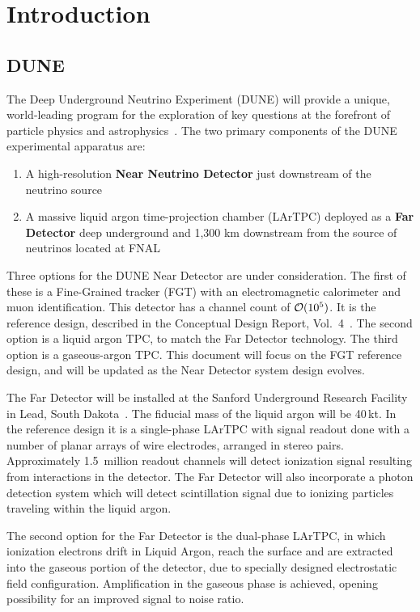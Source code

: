 \section{Introduction}
\subsection{DUNE}

The Deep Underground Neutrino Experiment (DUNE) will provide a unique, world-leading program
for the exploration of key questions at the forefront of particle physics and astrophysics~\cite{sciopps,cdr_vol2}.
The two primary components of the DUNE experimental apparatus are:

\begin{enumerate}

\item A high-resolution \textbf{Near Neutrino Detector} just downstream of the neutrino source
\item A massive liquid argon time-projection chamber (LArTPC) deployed as a \textbf{Far
Detector} deep underground and 1,300 km downstream from the source of neutrinos located at FNAL

\end{enumerate}

Three options for the DUNE Near Detector are under consideration.  The first of these is a Fine-Grained tracker (FGT) with
an electromagnetic calorimeter and muon identification.  This detector has a channel count of ${\cal O}(10^{5})$.  It is
the reference design, described in the Conceptual Design Report, Vol.~4~\cite{cdr_vol4_docdb}.  The second option is a liquid argon
TPC, to match the Far Detector technology.  The third option is a gaseous-argon TPC.  This document will focus on the FGT reference
design, and will be updated as the Near Detector system design evolves.

The Far Detector will be installed at the Sanford Underground Research Facility in Lead, South Dakota~\cite{surf}.
The fiducial mass of the liquid argon will be 40\,kt. In the reference design it is a single-phase LArTPC
with signal readout done with a number of planar arrays of wire electrodes, arranged in stereo pairs.
Approximately 1.5~million readout channels will detect ionization signal resulting from interactions in the detector. 
The Far Detector will also incorporate a photon detection system which will detect scintillation
signal due to ionizing particles traveling within the liquid argon.

The second option for the Far Detector is the dual-phase LArTPC, in which ionization electrons 
drift  in Liquid Argon, reach the surface and are extracted into the gaseous portion of the detector,
due to specially designed electrostatic field configuration. Amplification in the gaseous phase
is achieved, opening possibility for an improved signal to noise ratio.


